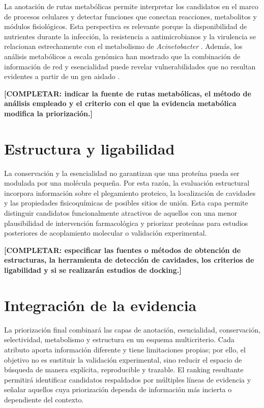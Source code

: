La anotación de rutas metabólicas permite interpretar los candidatos en el marco de procesos celulares y detectar funciones que conectan reacciones, metabolitos y módulos fisiológicos. Esta perspectiva es relevante porque la disponibilidad de nutrientes durante la infección, la resistencia a antimicrobianos y la virulencia se relacionan estrechamente con el metabolismo de \textit{Acinetobacter} \cite{Ren2023}. Además, los análisis metabólicos a escala genómica han mostrado que la combinación de información de red y esencialidad puede revelar vulnerabilidades que no resultan evidentes a partir de un gen aislado \cite{Shen2010}.

\textbf{[COMPLETAR: indicar la fuente de rutas metabólicas, el método de análisis empleado y el criterio con el que la evidencia metabólica modifica la priorización.]}

\section{Estructura y ligabilidad}

La conservación y la esencialidad no garantizan que una proteína pueda ser modulada por una molécula pequeña. Por esta razón, la evaluación estructural incorpora información sobre el plegamiento proteico, la localización de cavidades y las propiedades fisicoquímicas de posibles sitios de unión. Esta capa permite distinguir candidatos funcionalmente atractivos de aquellos con una menor plausibilidad de intervención farmacológica y priorizar proteínas para estudios posteriores de acoplamiento molecular o validación experimental.

\textbf{[COMPLETAR: especificar las fuentes o métodos de obtención de estructuras, la herramienta de detección de cavidades, los criterios de ligabilidad y si se realizarán estudios de docking.]}

\section{Integración de la evidencia}

La priorización final combinará las capas de anotación, esencialidad, conservación, selectividad, metabolismo y estructura en un esquema multicriterio. Cada atributo aporta información diferente y tiene limitaciones propias; por ello, el objetivo no es sustituir la validación experimental, sino reducir el espacio de búsqueda de manera explícita, reproducible y trazable. El ranking resultante permitirá identificar candidatos respaldados por múltiples líneas de evidencia y señalar aquellos cuya priorización dependa de información más incierta o dependiente del contexto.



